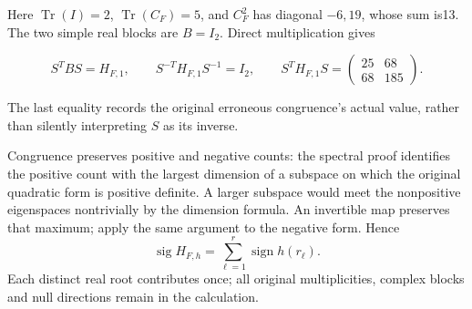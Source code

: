 \documentclass[
  11pt,
]{article}
\begin{document}
Here \(\operatorname{Tr}(I)=2\), \(\operatorname{Tr}(C_F)=5\), and
\(C_F^2\) has diagonal \(-6,19\), whose sum is13. The two simple real
blocks are \(B=I_2\). Direct multiplication gives

\[
 S^T B S=H_{F,1},\qquad
 S^{-T}H_{F,1}S^{-1}=I_2,\qquad
 S^TH_{F,1}S=\begin{pmatrix}25&68\\68&185\end{pmatrix}.
 \tag{EC4}
\]

The last equality records the original erroneous congruence's actual
value, rather than silently interpreting \(S\) as its inverse.

Congruence preserves positive and negative counts: the spectral proof
identifies the positive count with the largest dimension of a subspace
on which the original quadratic form is positive definite. A larger
subspace would meet the nonpositive eigenspaces nontrivially by the
dimension formula. An invertible map preserves that maximum; apply the
same argument to the negative form. Hence \[
\operatorname{sig}H_{F,h}
=\sum_{\ell=1}^{r}\operatorname{sign}h(r_\ell).
\tag{HP9}
\] Each distinct real root contributes once; all original
multiplicities, complex blocks and null directions remain in the
calculation.
\end{document}
